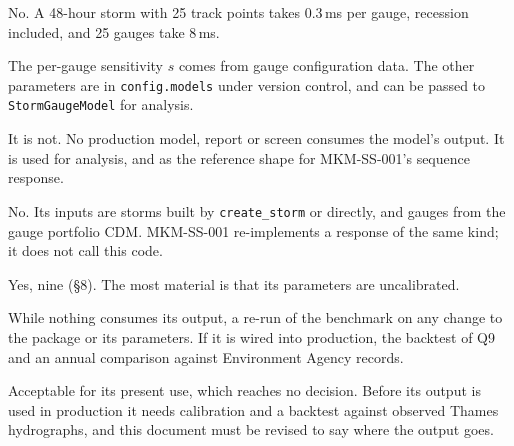 \documentclass[11pt,a4paper]{article}
\newcommand{\sgGaugeMs}{0.3}
\newcommand{\sgAllMs}{8}
\begin{document}
No. A 48-hour storm with 25 track points takes \sgGaugeMs\,ms per gauge, recession
included, and 25 gauges take \sgAllMs\,ms.

The per-gauge sensitivity $s$ comes from gauge configuration data. The other parameters
are in \texttt{config.models} under version control, and can be passed to
\texttt{StormGaugeModel} for analysis.

It is not. No production model, report or screen consumes the model's output. It is used
for analysis, and as the reference shape for MKM-SS-001's sequence response.

No. Its inputs are storms built by \texttt{create\_storm} or directly, and gauges from
the gauge portfolio CDM. MKM-SS-001 re-implements a response of the same kind; it does
not call this code.

Yes, nine (\S8). The most material is that its parameters are uncalibrated.

While nothing consumes its output, a re-run of the benchmark on any change to the package
or its parameters. If it is wired into production, the backtest of Q9 and an annual
comparison against Environment Agency records.

Acceptable for its present use, which reaches no decision. Before its output is used in
production it needs calibration and a backtest against observed Thames hydrographs, and
this document must be revised to say where the output goes.

\clearpage

\mkmchangelog
\end{document}
